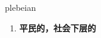 
\begin{frame}
{\huge plebeian}
\begin{center}
\begin{enumerate}\Large
  \item \textbf{平民的，社会下层的}
\end{enumerate}
\end{center}
\end{frame}
